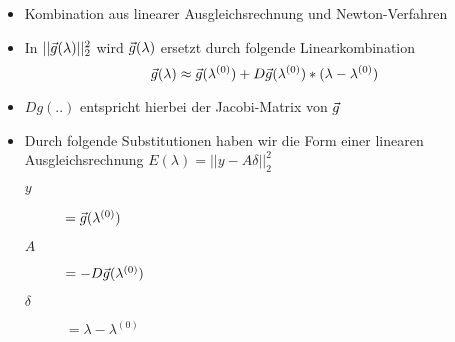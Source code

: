 \begin{itemize}
	\item Kombination aus linearer Ausgleichsrechnung und Newton-Verfahren
	\item In $||\vec g(\lambda) ||_2^2$ wird $\vec g(\lambda)$ ersetzt durch folgende
	      Linearkombination
		      {\large
			      $$\vec g(\lambda) \approx \vec  g(\lambda^{(0)}) + D\vec g(\lambda^{(0)}) * (\lambda
				      - \lambda^{(0)})$$
		      }
	\item $Dg(..)$ entspricht hierbei der Jacobi-Matrix von $\vec g$
	\item Durch folgende Substitutionen haben wir die Form einer linearen Ausgleichsrechnung
	      $E(\lambda) = ||y - A \delta||_2^2$
	      \begin{description}
		      \item[$y$] $= \vec g(\lambda^{(0)})$
		      \item[$A$] $= -D\vec g(\lambda^{(0)})$
		      \item[$\delta$] $= \lambda - \lambda^{(0)}$
	      \end{description}
\end{itemize}



